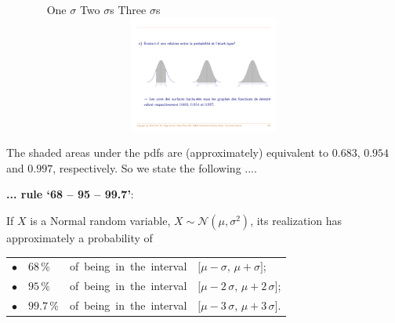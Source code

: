 \documentclass[notes=show,smaller,handout]{beamer}\usepackage[]{graphicx}\usepackage[]{color}
\newcommand{\N}{\mathcal{N}}
\begin{document}
\begin{frame}{\subsecname}



\begin{figure}[ptb]\centering
\ \hspace{0.6cm} One $\sigma$ \hspace{2.4cm} Two $\sigma$s \hspace{2.5cm} Three $\sigma$s \hspace{3cm}
\includegraphics[height=1.5in, width=4.5in]{img/Areas_Normal.pdf}%
\end{figure}%
The shaded areas under the pdfs are (approximately) equivalent to $0.683$, $0.954$ and $0.997$,
respectively. So we state  the following ....

\end{frame}%



\begin{frame}{\subsecname}





\textbf{... rule `68 -- 95 -- 99.7'}: \\ \bigskip


If $X$ is a Normal random variable, $X \sim \N(\mu, \sigma^2)$, its realization has approximately a probability of \\ \bigskip

\begin{tabular}{llll}
$\bullet$
&
$68 \, \%$
&
\mbox{of being in the interval}
&
$\lbrack \mu - \sigma, \, \mu + \sigma \rbrack$;\\[0.2cm]
$\bullet$
&
$95 \, \%$
&
\mbox{of being in the interval}
&
$\lbrack \mu - 2 \, \sigma, \, \mu + 2 \, \sigma \rbrack$;\\[0.2cm]
$\bullet$
&
$99.7 \, \%$
&
\mbox{of being in the interval}&
$\lbrack \mu - 3 \, \sigma, \, \mu + 3 \, \sigma \rbrack$.\\[0.2cm]
\end{tabular}
\end{frame}
\end{document}
